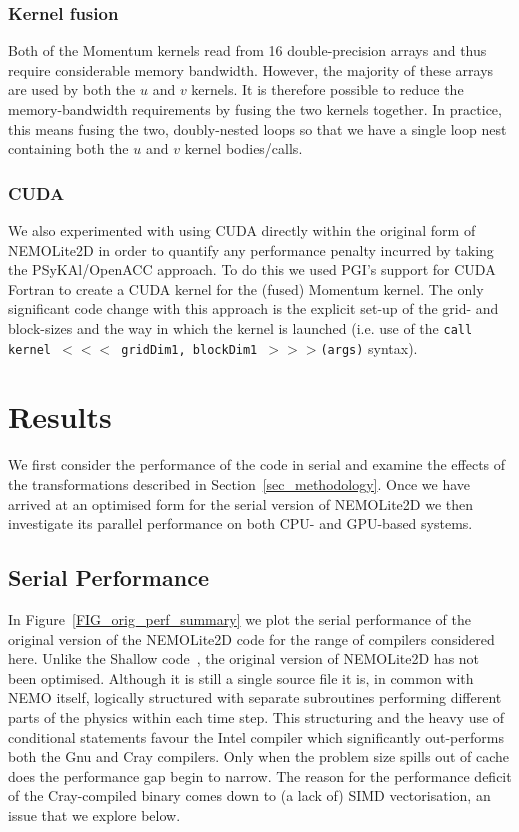 \documentclass[gmd, manuscript]{copernicus}
\begin{document}
\subsubsection{Kernel fusion}

Both of the Momentum kernels read from 16 double-precision arrays and
thus require considerable memory bandwidth.  However, the majority of
these arrays are used by both the $u$ and $v$ kernels. It is therefore
possible to reduce the memory-bandwidth requirements by fusing the two
kernels together. In practice, this means fusing the two,
doubly-nested loops so that we have a single loop nest containing both
the $u$ and $v$ kernel bodies/calls.

\subsubsection{CUDA}

We also experimented with using CUDA directly within the original form
of NEMOLite2D in order to quantify any performance penalty incurred by
taking the {PS}y{KA}l/OpenACC approach. To do this we used PGI's
support for CUDA Fortran to create a CUDA kernel for the (fused)
Momentum kernel. The only significant code change with this approach
is the explicit set-up of the grid- and block-sizes and the way in
which the kernel is launched (i.e. use of the \texttt{call kernel $<<<$
  gridDim1, blockDim1 $>>>$(args)} syntax).

\section{Results}

We first consider the performance of the code in serial and examine
the effects of the transformations described in
Section~\ref{sec_methodology}. Once we have arrived at an optimised
form for the serial version of NEMOLite2D we then investigate its
parallel performance on both CPU- and GPU-based systems.

\subsection{Serial Performance}

In Figure~\ref{FIG_orig_perf_summary} we plot the serial performance
of the original version of the NEMOLite2D code for the range of
compilers considered here. Unlike the Shallow
code~\citep{shallow_psykal}, the original version of NEMOLite2D has not
been optimised. Although it is still a single source file it is, in
common with NEMO itself, logically structured with separate
subroutines performing different parts of the physics within each time
step. This structuring and the heavy use of conditional statements
favour the Intel compiler which significantly out-performs both the
Gnu and Cray compilers. Only when the problem size spills out of cache
does the performance gap begin to narrow. The reason for the
performance deficit of the Cray-compiled binary comes down to (a lack
of) SIMD vectorisation, an issue that we explore below.
\end{document}
